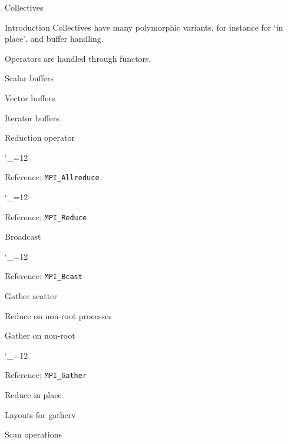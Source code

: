 \documentclass[11pt,headernav]{beamer}
\newcommand\referenceframe{\begingroup\catcode`\_=12 \referenceframett}
\gdef\referenceframett#1{
  \begin{numberedframe}{Reference: \texttt{MPI_#1}}
    \small
    
  \end{numberedframe}\endgroup}
\begin{document}
 {Collectives}

\begin{frame}{Introduction}
  Collectives have many polymorphic variants, for instance for `in place',
  and buffer handling.

  Operators are handled through functors.
\end{frame}
\begin{numberedframe}{Scalar buffers}
  
\end{numberedframe}
\begin{numberedframe}{Vector buffers}
  
\end{numberedframe}
\begin{numberedframe}{Iterator buffers}
  
\end{numberedframe}

\begin{numberedframe}{Reduction operator}
  
\end{numberedframe}
\referenceframe{Allreduce}
\referenceframe{Reduce}
\begin{numberedframe}{Broadcast}
  
\end{numberedframe}
\referenceframe{Bcast}
\begin{numberedframe}{Gather scatter}
  
\end{numberedframe}
\begin{numberedframe}{Reduce on non-root processes}
  
\end{numberedframe}
\begin{numberedframe}{Gather on non-root}
  
\end{numberedframe}
\referenceframe{Gather}
\begin{numberedframe}{Reduce in place}
  \footnotesize
  
\end{numberedframe}
\begin{numberedframe}{Layouts for gatherv}
  
\end{numberedframe}
\begin{numberedframe}{Scan operations}
  
\end{numberedframe}
\end{document}
